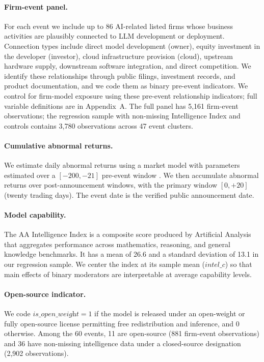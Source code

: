 \documentclass[12pt]{article}
\begin{document}
\paragraph{Firm-event panel.}
For each event we include up to 86 AI-related listed firms whose business
activities are plausibly connected to LLM development or deployment. Connection
types include direct model development (owner), equity investment in the developer
(investor), cloud infrastructure provision (cloud), upstream hardware supply,
downstream software integration, and direct competition. We identify these
relationships through public filings, investment records, and product
documentation, and we code them as binary pre-event indicators. We control for
firm-model exposure using these pre-event relationship indicators; full variable
definitions are in Appendix~A. The full panel has 5,161 firm-event observations;
the regression sample with non-missing Intelligence Index and controls contains
3,780 observations across 47 event clusters.

\paragraph{Cumulative abnormal returns.}
We estimate daily abnormal returns using a market model with parameters estimated
over a $[-200, -21]$ pre-event window \citep{MacKinlay1997}. We then accumulate
abnormal returns over post-announcement windows, with the primary window
$[0,{+}20]$ (twenty trading days). The event date is the verified public
announcement date.

\paragraph{Model capability.}
The AA Intelligence Index is a composite score produced by Artificial Analysis
that aggregates performance across mathematics, reasoning, and general knowledge
benchmarks. It has a mean of 26.6 and a standard deviation of 13.1 in our
regression sample. We center the index at its sample mean ($\textit{intel\_c}$)
so that main effects of binary moderators are interpretable at average capability
levels.

\paragraph{Open-source indicator.}
We code $\textit{is\_open\_weight} = 1$ if the model is released under an
open-weight or fully open-source license permitting free redistribution and
inference, and 0 otherwise. Among the 60 events, 11 are open-source (881
firm-event observations) and 36 have non-missing intelligence data under a
closed-source designation (2,902 observations).
\end{document}
